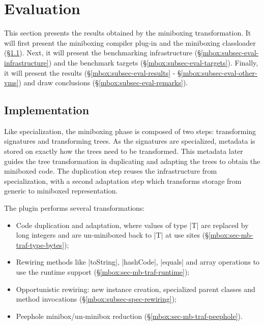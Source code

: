 \section{Evaluation}
\label{mbox:sec-evaluation}

\newcommand{\sctx}[0]{Single Ctx.}
\newcommand{\mctx}[0]{Multi Ctx.}
\newcommand{\bn}[1]{\textbf{#1}}
\newcommand{\opt}[1]{#1}

This section presents the results obtained by the miniboxing transformation. It will first present the miniboxing compiler plug-in and the miniboxing classloader (\S\ref{mbox:subsec-eval-impl}). Next, it will present the benchmarking infrastructure (\S\ref{mbox:subsec-eval-infrastructure}) and the benchmark targets (\S\ref{mbox:subsec-eval-targets}). Finally, it will present the results (\S\ref{mbox:subsec-eval-results} - \S\ref{mbox:subsec-eval-other-vms}) and draw conclusions (\S\ref{mbox:subsec-eval-remarks}).

\subsection{Implementation}
\label{mbox:subsec-eval-impl}

 Like specialization, the miniboxing phase is composed of two steps: transforming signatures and transforming trees. As the signatures are specialized, metadata is stored on exactly how the trees need to be transformed. This metadata later guides the tree transformation in duplicating and adapting the trees to obtain the miniboxed code. The duplication step reuses the infrastructure from specialization, with a second adaptation step which transforms storage from generic to miniboxed representation.

The plugin performs several transformations:
\begin{itemize}
\item Code duplication and adaptation, where values of type |T| are replaced by long integers and are un-miniboxed back to |T| at use sites (\S\ref{mbox:sec-mb-traf-type-bytes});
\item Rewiring methods like |toString|, |hashCode|, |equals| and array operations to use the runtime support (\S\ref{mbox:sec-mb-traf-runtime});
\item Opportunistic rewiring: new instance creation, specialized parent classes and method invocations (\S\ref{mbox:subsec-spec-rewiring});
\item Peephole minibox/un-minibox reduction (\S\ref{mbox:sec-mb-traf-peephole}).
\end{itemize}

